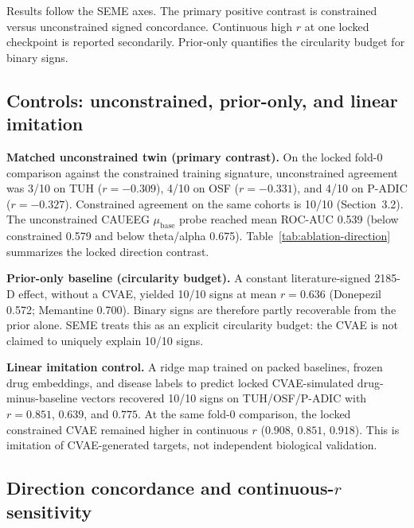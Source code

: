 Results follow the SEME axes. The primary positive contrast is constrained versus unconstrained signed concordance. Continuous high \(r\) at one locked checkpoint is reported secondarily. Prior-only quantifies the circularity budget for binary signs.

\subsection{Controls: unconstrained, prior-only, and linear imitation}

\textbf{Matched unconstrained twin (primary contrast).} On the locked fold-0 comparison against the constrained training signature, unconstrained agreement was 3/10 on TUH (\(r=-0.309\)), 4/10 on OSF (\(r=-0.331\)), and 4/10 on P-ADIC (\(r=-0.327\)). Constrained agreement on the same cohorts is 10/10 (Section~3.2). The unconstrained CAUEEG \(\mu_{\mathrm{base}}\) probe reached mean ROC-AUC 0.539 (below constrained 0.579 and below theta/alpha 0.675). Table~\ref{tab:ablation-direction} summarizes the locked direction contrast.


\textbf{Prior-only baseline (circularity budget).} A constant literature-signed 2185-D effect, without a CVAE, yielded 10/10 signs at mean \(r=0.636\) (Donepezil 0.572; Memantine 0.700). Binary signs are therefore partly recoverable from the prior alone. SEME treats this as an explicit circularity budget: the CVAE is not claimed to uniquely explain 10/10 signs.

\textbf{Linear imitation control.} A ridge map trained on packed baselines, frozen drug embeddings, and disease labels to predict locked CVAE-simulated drug-minus-baseline vectors recovered 10/10 signs on TUH/OSF/P-ADIC with \(r=0.851\), \(0.639\), and \(0.775\). At the same fold-0 comparison, the locked constrained CVAE remained higher in continuous \(r\) (\(0.908\), \(0.851\), \(0.918\)). This is imitation of CVAE-generated targets, not independent biological validation.

\subsection{Direction concordance and continuous-\(r\) sensitivity}

